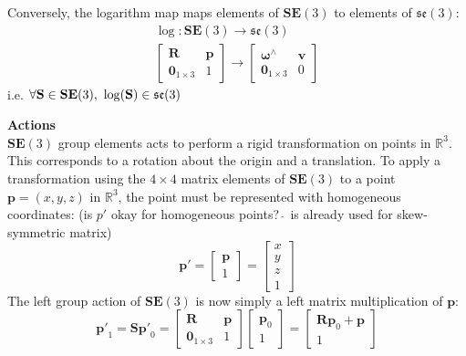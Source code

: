 			Conversely, the logarithm map maps elements of $\mathbf{SE}(3)$ to elements of $\mathfrak{se}(3)$:
			\begin{equation}
				\begin{split}
					\log: \mathbf{SE}(3) \rightarrow \mathfrak{se}(3)\\
					\begin{bmatrix}
						\mathbf{R}	&	\mathbf{p} \\
						\textbf{0}_{1 \times 3}		& 	1 					 				  
					\end{bmatrix}
					\rightarrow 
					\begin{bmatrix}
					 	\bm{\omega}^{\wedge}	&  \mathbf{v}\\
					 	\textbf{0}_{1 \times 3} & 0			
					\end{bmatrix}
				\end{split}		
			\end{equation}		
			i.e. $\forall \mathbf{S} \in \mathbf{SE}(3)  \textnormal{, } \log(\mathbf{S}) \in  \mathfrak{se}(3)$
		
		\textbf{Actions}\\
		$\mathbf{SE}(3)$ group elements acts to perform a rigid transformation on points in $\mathbb{R}^3$. This corresponds to a rotation about the origin and a translation.
		To apply a transformation using the $4 \times 4$ matrix elements of $\mathbf{SE}(3)$ to a point $\textbf{p} = (x,y,z) $ in $\mathbb{R}^3$, the point must be represented with homogeneous coordinates: (is $p'$ okay for homogeneous points? $\hat{\:}$ is already used for skew-symmetric matrix)
		\begin{equation}
			\mathbf{p'} = 
			\begin{bmatrix}
				  \mathbf{p} \\
				  1	
			\end{bmatrix} =
			\begin{bmatrix}
				  x	\\
				  y	\\
				  z	\\
				  1	
			\end{bmatrix}
		\end{equation}
		The left group action of $\mathbf{SE}(3)$ is now simply a left matrix multiplication of $\mathbf{p}$:
		\begin{equation}
			\mathbf{p'}_1 = \mathbf{S}\mathbf{p'}_0 = 
			\begin{bmatrix}
				\mathbf{R}	&	\mathbf{p} \\
				\textbf{0}_{1 \times 3}		& 	1 					 				  
			\end{bmatrix}
			\begin{bmatrix}
				\mathbf{p}_0 \\
				1	
			\end{bmatrix}
			=
			\begin{bmatrix}
				\mathbf{R}\mathbf{p}_0 + \mathbf{p}\\
				1	
			\end{bmatrix}
		\end{equation}
		
